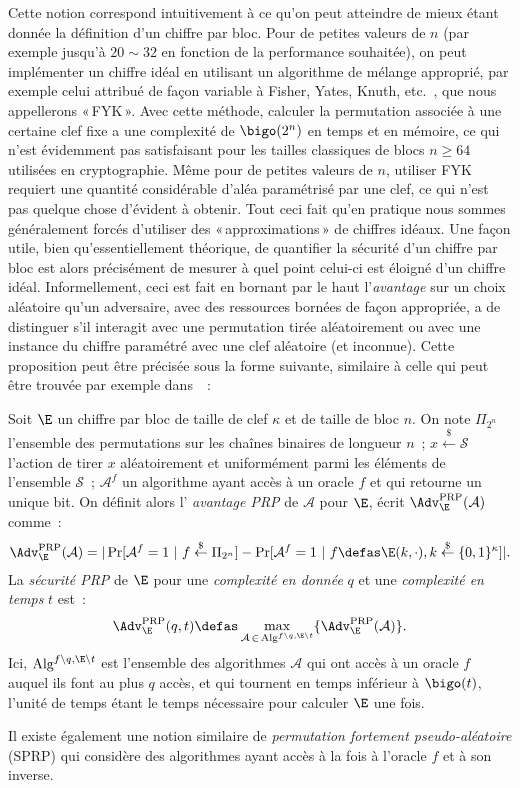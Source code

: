 Cette notion correspond intuitivement à ce qu'on peut atteindre de mieux étant donnée la définition d'un chiffre par bloc.
Pour de petites valeurs de $n$ (par exemple jusqu'à $20 \sim 32$ en fonction de la performance souhaitée), on peut
implémenter un chiffre idéal en utilisant un algorithme de mélange approprié, par exemple celui attribué de façon
variable à Fisher, Yates, Knuth, etc.~\cite{uniform_shuffle}, que nous appellerons «\,FYK\,».
Avec cette méthode, calculer la permutation associée à une certaine clef fixe a une complexité de
$\bigo(2^n)$ en temps et en mémoire, ce qui n'est
évidemment pas satisfaisant pour les tailles classiques de blocs $n \geq 64$ utilisées en cryptographie.
Même pour de petites valeurs de $n$, utiliser FYK requiert une quantité considérable d'aléa paramétrisé par une clef,
ce qui n'est pas quelque chose d'évident à obtenir. 
Tout ceci fait qu'en pratique nous sommes généralement forcés d'utiliser des «\,approximations\,» de chiffres idéaux.
Une façon utile, bien qu'essentiellement théorique, de quantifier la sécurité d'un chiffre par bloc est alors précisément
de mesurer à quel point celui-ci est éloigné d'un chiffre idéal.
Informellement, ceci est fait en bornant par le haut l'\emph{avantage} sur un choix aléatoire qu'un adversaire,
avec des ressources bornées de façon appropriée, a de distinguer s'il interagit avec une permutation tirée aléatoirement
ou avec une instance du chiffre paramétré avec une clef aléatoire (et inconnue). Cette proposition peut être précisée
sous la forme suivante, similaire à celle qui peut être trouvée par exemple dans~\cite{DBLP:journals/jcss/BellareKR00}~:

\begin{fdefi}
Soit $\E$ un chiffre par bloc de taille de clef $\kappa$ et de taille de bloc $n$.
On note 
$\Pi_{2^n}$ l'ensemble des permutations sur les chaînes binaires de longueur $n$~; $x \overset{\$}{\leftarrow} \mathcal{S}$
l'action de tirer $x$ aléatoirement et uniformément parmi les éléments de l'ensemble $\mathcal{S}$~; $\mathcal{A}^{f}$
un algorithme ayant accès à un oracle $f$ et qui retourne un unique bit.
On définit alors 
l' \emph{avantage PRP} de $\mathcal{A}$ pour $\E$, écrit $\Adv^{\text{PRP}}_{\E}(\mathcal{A})$ comme~:
\[
\Adv^{\text{PRP}}_{\E}(\mathcal{A}) = |\Pr[\mathcal{A}^f = 1~|~f \overset{\$}{\leftarrow} \Pi_{2^n}] - \Pr[\mathcal{A}^f = 1~|~f \defas \E(k,\cdot), k \overset{\$}{\leftarrow} \{0,1\}^\kappa]|.
\]
La \emph{sécurité PRP} de $\E$ pour une \emph{complexité en donnée} $q$ et une \emph{complexité en temps} $t$ est~:
\[
\Adv^{\text{PRP}}_{\E}(q,t) \defas \max_{\mathcal{A}\,\in\,\text{Alg}^{f\backslash q, \E\backslash t}} \{\Adv^{\text{PRP}}_{\E}(\mathcal{A})\}.
\]
Ici, 
$\text{Alg}^{f\backslash q, \E\backslash t}$ est l'ensemble des algorithmes $\mathcal{A}$ qui ont accès à un oracle $f$ auquel ils font au plus $q$ accès,
et qui tournent en temps inférieur à
$\bigo(t)$, l'unité de temps étant le temps nécessaire pour calculer $\E$ une fois.
\label{def:fprp}
\end{fdefi}
Il existe également une notion similaire de \emph{permutation fortement pseudo-aléatoire} (SPRP) qui considère des algorithmes ayant accès à la fois à l'oracle $f$ et à son inverse.

